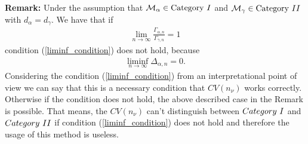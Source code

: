\documentclass[Research_Module_ES.tex]{subfiles}
\begin{document}
\textbf{Remark:}
	Under the assumption that $\mathcal{M}_\alpha\in\text{Category}~\RM{1}$ and $\mathcal{M}_\gamma\in\text{Category}~\RM{2}$ with $d_\alpha=d_\gamma$. We have that if
	\begin{align*}
		\lim_{n\rightarrow\infty}\frac{\Gamma_{\alpha,n}}{\Gamma_{\gamma,n}}=1
	\end{align*} 
	condition (\ref{liminf_condition}) does not hold, because
	\begin{align*}
	\liminf_{n\rightarrow\infty}\Delta_{\alpha,n}=0.
	\end{align*}
Considering the condition (\ref{liminf_condition}) from an interpretational point of view we can say that
this is a necessary condition that $CV(n_\nu)$ works correctly. Otherwise if the condition does not hold, the above described case in the Remark is possible. That means, the $CV(n_\nu)$ can't distinguish between $Category~\RM{1}$ and $Category~\RM{2}$ if condition (\ref{liminf_condition}) does not hold and therefore the usage of this method is useless.
\end{document}
